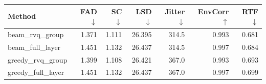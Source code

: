 \begin{tabular}{lrrrrrr}
\toprule
Method & FAD$\downarrow$ & SC$\downarrow$ & LSD$\downarrow$ & Jitter$\downarrow$ & EnvCorr$\uparrow$ & RTF$\downarrow$ \\
\midrule
beam\_rvq\_group & 1.371 & 1.111 & 26.395 & 314.5 & 0.993 & 0.681 \\
beam\_full\_layer & 1.451 & 1.132 & 26.437 & 314.5 & 0.997 & 0.684 \\
greedy\_rvq\_group & 1.399 & 1.108 & 26.421 & 367.0 & 0.993 & 0.693 \\
greedy\_full\_layer & 1.451 & 1.132 & 26.437 & 367.0 & 0.997 & 0.699 \\
\bottomrule
\end{tabular}
